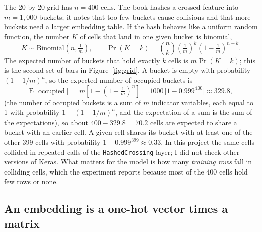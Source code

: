 The 20 by 20 grid has $n = 400$ cells. The book hashes a crossed feature into $m = 1{,}000$ buckets; it notes that too few buckets cause collisions and that more buckets need a larger embedding table. If the hash behaves like a uniform random function, the number $K$ of cells that land in one given bucket is binomial,
\begin{equation}
K \sim \mathrm{Binomial}\!\left(n, \tfrac{1}{m}\right), \qquad
\Pr(K = k) = \binom{n}{k}\left(\tfrac{1}{m}\right)^{k}\left(1 - \tfrac{1}{m}\right)^{n-k} .
\end{equation}
The expected number of buckets that hold exactly $k$ cells is $m \Pr(K = k)$; this is the second set of bars in Figure~\ref{fig:grid}. A bucket is empty with probability $(1 - 1/m)^{n}$, so the expected number of occupied buckets is
\begin{equation}
\mathrm{E}[\text{occupied}] = m\left[1 - \left(1 - \tfrac{1}{m}\right)^{n}\right] = 1000\,\bigl[1 - 0.999^{400}\bigr] \approx 329.8 ,
\end{equation}
(the number of occupied buckets is a sum of $m$ indicator variables, each equal to 1 with probability $1 - (1-1/m)^n$, and the expectation of a sum is the sum of the expectations), so about $400 - 329.8 = 70.2$ cells are expected to share a bucket with an earlier cell. A given cell shares its bucket with at least one of the other 399 cells with probability $1 - 0.999^{399} \approx 0.33$. In this project the same cells collided in repeated calls of the \texttt{HashedCrossing} layer; I did not check other versions of Keras. What matters for the model is how many \emph{training rows} fall in colliding cells, which the experiment reports because most of the 400 cells hold few rows or none.

\subsection{An embedding is a one-hot vector times a matrix}
\label{sec:math-embed}

